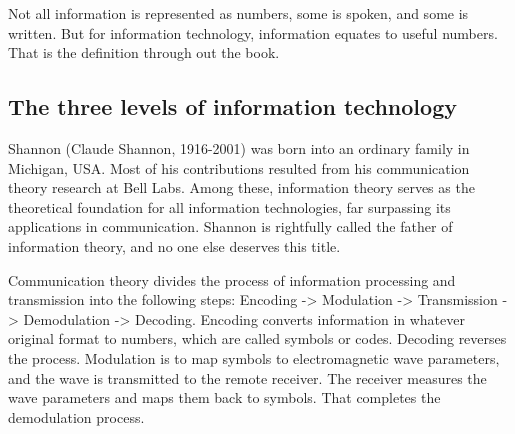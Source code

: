 \documentclass[oneside, letter, 12pt]{book}
\begin{document}
Not all information is represented as numbers, some is spoken, and some is written. But for information technology, information equates to useful numbers. That is the definition through out the book.

\subsection{The three levels of information technology}
Shannon (Claude Shannon, 1916-2001) was born into an ordinary family in Michigan, USA. Most of his contributions resulted from his communication theory research at Bell Labs. Among these, information theory serves as the theoretical foundation for all information technologies, far surpassing its applications in communication. Shannon is rightfully called the father of information theory, and no one else deserves this title.

Communication theory divides the process of information processing and transmission into the following steps:
Encoding -> Modulation -> Transmission -> Demodulation -> Decoding.
Encoding converts information in whatever original format to numbers, which are called symbols or codes. Decoding reverses the process. Modulation is to map symbols to electromagnetic wave parameters, and the wave is transmitted to the remote receiver. The receiver measures the wave parameters and maps them back to symbols. That completes the demodulation process.
\end{document}
